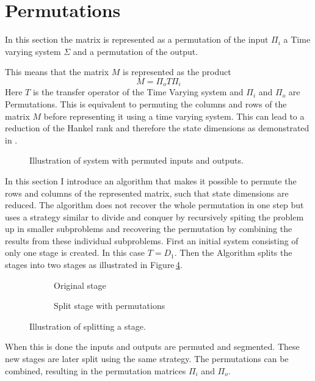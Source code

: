 \documentclass[doctype=mastersthesis,BCOR=15mm,biblatex]{ldvbook}%
\begin{document}
 

\section{Permutations}\label{sec:permutation}

In this section the matrix is represented as a permutation of the input $\Pi_i$ a Time varying system $\Sigma$ and a permutation of the output.

This means that the matrix $M$ is represented as the product
\begin{equation}
M = \Pi_o T \Pi_i
\end{equation}
Here $T$ is the transfer operator of the Time Varying system and $\Pi_i$ and $\Pi_o$ are Permutations.
This is equivalent to permuting the columns and rows of the matrix $M$ before representing it using a time varying system.
This can lead to a reduction of the Hankel rank and therefore the state dimensions as demonstrated in \cite{diepold_optic_2004}. 
\begin{figure}[!htb]
	\centering
	
	\caption{Illustration of system with permuted inputs and outputs.}
	\label{fig:system_permuted}
\end{figure}
In this section I introduce an algorithm that makes it possible to permute the rows and columns of the represented matrix, such that state dimensions are reduced.
The algorithm does not recover the whole permutation in one step but uses a strategy similar to divide and conquer by recursively spiting the problem up in smaller subproblems and recovering the permutation by combining the results from these individual subproblems.
First an initial system consisting of only one stage is created.
In this case $T = D_1$.
Then the Algorithm splits the stages into two stages as illustrated in Figure\,\ref{fig:split_permute}.
\begin{figure}[!htb]
	\centering
	
	\begin{subfigure}[b]{0.45\textwidth}
		\caption{Original stage}
		\label{fig:split_permute_a}
	\end{subfigure}
	\hspace{0.8cm}
	\begin{subfigure}[b]{0.45\textwidth}
		\caption{Split stage with permutations}
		\label{fig:split_permute_b}
	\end{subfigure}
	\caption{Illustration of splitting a stage.}
	\label{fig:split_permute}
\end{figure}
When this is done the inputs and outputs are permuted and segmented.
These new stages are later split using the same strategy.
The permutations can be combined, resulting in the permutation matrices $\Pi_i$ and $\Pi_o$.
\end{document}

